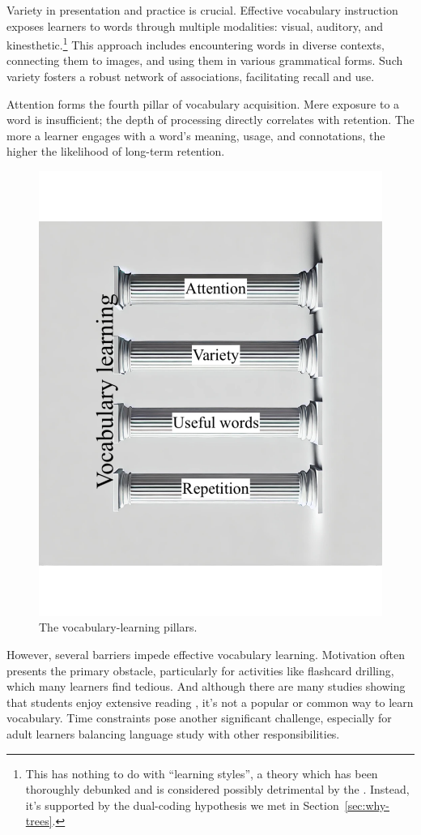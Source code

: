 Variety in presentation and practice is crucial. Effective vocabulary instruction exposes learners to words through multiple modalities: visual, auditory, and kinesthetic.\footnote{This has nothing to do with ``learning styles'', a theory which has been thoroughly debunked and is considered possibly detrimental by the \citet{apa2019learning}. Instead, it's supported by the dual-coding hypothesis \citep{ginns2005} we met in Section~\ref{sec:why-trees}.} This approach includes encountering words in diverse contexts, connecting them to images, and using them in various grammatical forms. Such variety fosters a robust network of associations, facilitating recall and use.

Attention forms the fourth pillar of vocabulary acquisition. Mere exposure to a word is insufficient; the depth of processing directly correlates with retention. The more a learner engages with a word's meaning, usage, and connotations, the higher the likelihood of long-term retention.

\begin{figure}
    \centering
    \includegraphics[width=0.5\linewidth]{figures/vocabPillars.pdf}
    \caption{The vocabulary-learning pillars.}
    \label{fig:vocab-pillars-AI}
\end{figure}

However, several barriers impede effective vocabulary learning. Motivation often presents the primary obstacle, particularly for activities like flashcard drilling, which many learners find tedious. And although there are many studies showing that students enjoy extensive reading \citep{Robb2013ER}, it's not a popular or common way to learn vocabulary. Time constraints pose another significant challenge, especially for adult learners balancing language study with other responsibilities.

